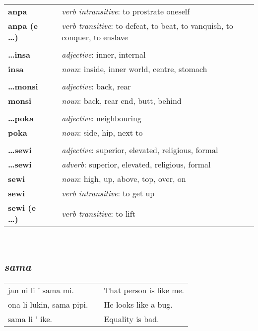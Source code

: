 \begin{supertabular}{p{2,5cm}|ll}
\textbf{anpa} && \textit{verb intransitive}: to prostrate oneself \\ %
\textbf{anpa (e \dots)} && \textit{verb transitive}: to defeat, to beat, to vanquish, to conquer, to enslave \\ %
 && \\ %
\textbf{\dots insa} && \textit{adjective}: inner, internal \\ %
\textbf{insa} && \textit{noun}: inside, inner world, centre, stomach \\ %
 && \\ %
\textbf{\dots monsi} && \textit{adjective}: back, rear \\ %
\textbf{monsi} && \textit{noun}: back, rear end, butt, behind \\ %
 && \\ %
\textbf{\dots poka} && \textit{adjective}: neighbouring \\ %
\textbf{poka} && \textit{noun}: side, hip, next to \\ %
 && \\ %
\textbf{\dots sewi} && \textit{adjective}: superior, elevated, religious, formal \\ %
\textbf{\dots sewi} && \textit{adverb}: superior, elevated, religious, formal \\ %
\textbf{sewi} && \textit{noun}: high, up, above, top, over, on \\ %
\textbf{sewi} && \textit{verb intransitive}: to get up \\ %
\textbf{sewi (e \dots)} && \textit{verb transitive}: to lift \\ %
\end{supertabular} \\
%
\subsection*{\textit{sama}}
%
\begin{supertabular}{p{5,5cm}|ll}
jan ni li ' sama mi. && That person is like me. \\
ona li lukin, sama pipi. && He looks like a bug. \\
sama li ' ike. && Equality is bad. \\
\end{supertabular} 
%
